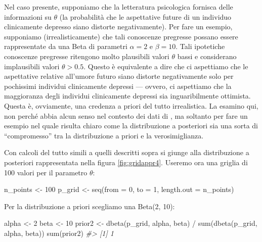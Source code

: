 \documentclass[
  11pt,
]{krantz}
\makeatletter
\newenvironment{Shaded}{\begin{snugshade}}{\end{snugshade}}
\newcommand{\AttributeTok}[1]{\textcolor[rgb]{0.61,0.61,0.61}{#1}}
\newcommand{\CommentTok}[1]{\textcolor[rgb]{0.37,0.37,0.37}{\textit{#1}}}
\newcommand{\DecValTok}[1]{\textcolor[rgb]{0.06,0.06,0.06}{#1}}
\newcommand{\FunctionTok}[1]{\textcolor[rgb]{0,0,0}{#1}}
\newcommand{\NormalTok}[1]{#1}
\newcommand{\OtherTok}[1]{\textcolor[rgb]{0.37,0.37,0.37}{#1}}
\newcommand{\SpecialCharTok}[1]{\textcolor[rgb]{0,0,0}{#1}}
\newenvironment{kframe}{%
\medskip{}
\setlength{\fboxsep}{.8em}
 \def\at@end@of@kframe{}%
 \ifinner\ifhmode%
  \def\at@end@of@kframe{\end{minipage}}%
  \begin{minipage}{\columnwidth}%
 \fi\fi%
 \def\FrameCommand##1{\hskip\@totalleftmargin \hskip-\fboxsep
 \colorbox{shadecolor}{##1}\hskip-\fboxsep
     \hskip-\linewidth \hskip-\@totalleftmargin \hskip\columnwidth}%
 \MakeFramed {\advance\hsize-\width
   \@totalleftmargin\z@ \linewidth\hsize
   \@setminipage}}%
 {\par\unskip\endMakeFramed%
 \at@end@of@kframe}
\renewenvironment{Shaded}{\begin{kframe}}{\end{kframe}}
\theoremstyle{definition}
\theoremstyle{definition}
\theoremstyle{definition}
\theoremstyle{definition}
\theoremstyle{remark}
\makeatother
\begin{document}
Nel caso presente, supponiamo che la letteratura psicologica fornisca delle informazioni su \(\theta\) (la probabilità che le aspettative future di un individuo clinicamente depresso siano distorte negativamente). Per fare un esempio, supponiamo (irrealisticamente) che tali conoscenze pregresse possano essere rappresentate da una Beta di parametri \(\alpha = 2\) e \(\beta = 10\). Tali ipotetiche conoscenze pregresse ritengono molto plausibili valori \(\theta\) bassi e considerano implausibili valori \(\theta > 0.5\). Questo è equivalente a dire che ci aspettiamo che le aspettative relative all'umore futuro siano distorte negativamente solo per pochissimi individui clinicamente depressi --- ovvero, ci aspettiamo che la maggioranza degli individui clinicamente depressi sia inguaribilmente ottimista. Questa è, ovviamente, una credenza a priori del tutto irrealistica. La esamino qui, non perché abbia alcun senso nel contesto dei dati di \citet{zetschefuture2019}, ma soltanto per fare un esempio nel quale risulta chiaro come la distribuzione a posteriori sia una sorta di ``compromesso'' tra la distribuzione a priori e la verosimiglianza.

Con calcoli del tutto simili a quelli descritti sopra si giunge alla distribuzione a posteriori rappresentata nella figura \ref{fig:gridappr4}. Useremo ora una griglia di 100 valori per il parametro \(\theta\):

\begin{Shaded}
\begin{Highlighting}[]
\NormalTok{n\_points }\OtherTok{\textless{}{-}} \DecValTok{100}
\NormalTok{p\_grid }\OtherTok{\textless{}{-}} \FunctionTok{seq}\NormalTok{(}\AttributeTok{from =} \DecValTok{0}\NormalTok{, }\AttributeTok{to =} \DecValTok{1}\NormalTok{, }\AttributeTok{length.out =}\NormalTok{ n\_points)}
\end{Highlighting}
\end{Shaded}

Per la distribuzione a priori scegliamo una Beta(2, 10):

\begin{Shaded}
\begin{Highlighting}[]
\NormalTok{alpha }\OtherTok{\textless{}{-}} \DecValTok{2}
\NormalTok{beta }\OtherTok{\textless{}{-}} \DecValTok{10}
\NormalTok{prior2 }\OtherTok{\textless{}{-}} \FunctionTok{dbeta}\NormalTok{(p\_grid, alpha, beta) }\SpecialCharTok{/} \FunctionTok{sum}\NormalTok{(}\FunctionTok{dbeta}\NormalTok{(p\_grid, alpha, beta))}
\FunctionTok{sum}\NormalTok{(prior2)}
\CommentTok{\#\textgreater{} [1] 1}
\end{Highlighting}
\end{Shaded}
\end{document}
